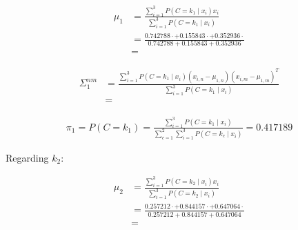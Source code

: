 \documentclass[12pt]{article}
\begin{document}
\begin{enumerate}[leftmargin=\labelsep]
\begin{itemize}[leftmargin=]
                \begin{equation*}
                  \begin{aligned}
                    \mu_1 & = \frac{\sum_{i=1}^3 P(C = k_1 \mid x_i) x_i}{\sum_{i=1}^3 P(C = k_1 \mid x_i)}                                                                                      \\
                          & = \frac{0.742788 \cdot  + 0.155843 \cdot  + 0.352936 \cdot }{0.742788 + 0.155843 + 0.352936} \\
                          & = 
                  \end{aligned}
                \end{equation*}

                \begin{equation*}
                  \begin{aligned}
                    \Sigma^{nm}_1 & = \frac{\sum_{i=1}^3 P(C = k_1 \mid x_i) (x_{i, n} - \mu_{1, n}) (x_{i, m} - \mu_{1, m})^T}{\sum_{i=1}^3 P(C = k_1 \mid x_i)} \\
                                  & = 
                  \end{aligned}
                \end{equation*}

                \begin{equation*}
                  \begin{aligned}
                    \pi_1 = P(C = k_1) = \frac{\sum_{i=1}^3 P(C = k_1 \mid x_i)}{\sum_{c=1}^2\sum_{i=1}^3 P(C = k_c \mid x_i)} = 0.417189
                  \end{aligned}
                \end{equation*}

                Regarding $k_2$:

                \begin{equation*}
                  \begin{aligned}
                    \mu_2 & = \frac{\sum_{i=1}^3 P(C = k_2 \mid x_i) x_i}{\sum_{i=1}^3 P(C = k_2 \mid x_i)}                                                                                      \\
                          & = \frac{0.257212 \cdot  + 0.844157 \cdot  + 0.647064 \cdot }{0.257212 + 0.844157 + 0.647064} \\
                          & = 
                  \end{aligned}
                \end{equation*}


\end{itemize}
\end{enumerate}
\end{document}
